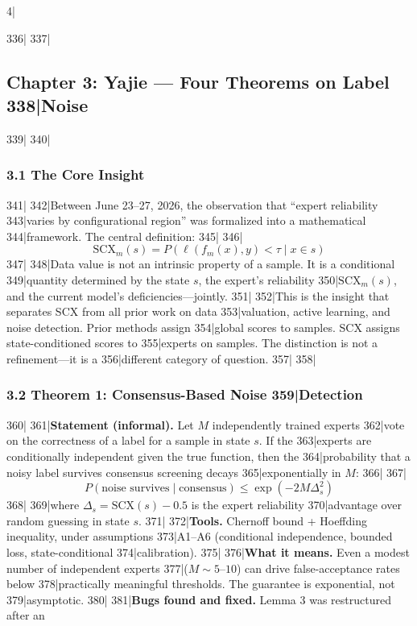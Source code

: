 4|\documentclass[
5|  12pt,
6|]{article}
\begin{document}
336|
337|\subsection{Chapter 3: Yajie --- Four Theorems on Label
338|Noise}\label{chapter-3-yajie-four-theorems-on-label-noise}
339|
340|\subsubsection{3.1 The Core Insight}\label{the-core-insight}
341|
342|Between June 23--27, 2026, the observation that ``expert reliability
343|varies by configurational region'' was formalized into a mathematical
344|framework. The central definition:
345|
346|\[{\text{SCX}}_m(s) = P(\ell(f_m(x), y) < \tau \mid x \in s)\]
347|
348|Data value is not an intrinsic property of a sample. It is a conditional
349|quantity determined by the state \(s\), the expert's reliability
350|\({\text{SCX}}_m(s)\), and the current model's deficiencies---jointly.
351|
352|This is the insight that separates SCX from all prior work on data
353|valuation, active learning, and noise detection. Prior methods assign
354|global scores to samples. SCX assigns state-conditioned scores to
355|experts on samples. The distinction is not a refinement---it is a
356|different category of question.
357|
358|\subsubsection{3.2 Theorem 1: Consensus-Based Noise
359|Detection}\label{theorem-1-consensus-based-noise-detection}
360|
361|\textbf{Statement (informal).} Let \(M\) independently trained experts
362|vote on the correctness of a label for a sample in state \(s\). If the
363|experts are conditionally independent given the true function, then the
364|probability that a noisy label survives consensus screening decays
365|exponentially in \(M\):
366|
367|\[P(\text{noise survives} \mid {\text{consensus}}) \leq \exp(-2M\Delta_s^2)\]
368|
369|where \(\Delta_s = {\text{SCX}}(s) - 0.5\) is the expert reliability
370|advantage over random guessing in state \(s\).
371|
372|\textbf{Tools.} Chernoff bound + Hoeffding inequality, under assumptions
373|A1--A6 (conditional independence, bounded loss, state-conditional
374|calibration).
375|
376|\textbf{What it means.} Even a modest number of independent experts
377|(\(M \sim 5\)--\(10\)) can drive false-acceptance rates below
378|practically meaningful thresholds. The guarantee is exponential, not
379|asymptotic.
380|
381|\textbf{Bugs found and fixed.} Lemma 3 was restructured after an
\end{document}
